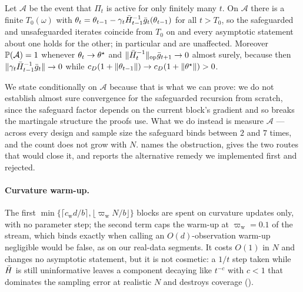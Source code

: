 \begin{proposition}
\label{prop:shift}
Let $\mathcal A$ be the event that $\Pi_t$ is active for only finitely many $t$. On $\mathcal A$
there is a finite $T_0(\omega)$ with
$\theta_t=\theta_{t-1}-\gamma_t\bar{H}_{t-1}^{-1}\bar{g}_t(\theta_{t-1})$ for all $t>T_0$, so the
safeguarded and unsafeguarded iterates coincide from $T_0$ on and every asymptotic statement about
one holds for the other; in particular  and  are
unaffected. Moreover $\mathbb{P}(\mathcal A)=1$ whenever $\theta_t\to\theta^\star$ and
$\lVert \bar{H}_t^{-1} \rVert_{\mathrm{op}}\bar{g}_{t+1}\to0$ almost surely, because then
$\lVert \gamma_t\bar{H}_{t-1}^{-1}\bar{g}_t \rVert\to0$ while $c_D(1+\lVert \theta_{t-1} \rVert)\to c_D(1+\lVert \theta^\star \rVert)>0$.
\end{proposition}

\noindent
We state  conditionally on $\mathcal A$ because that is what we can prove: we do not
establish almost sure convergence for the safeguarded recursion from scratch, since the safeguard factor
depends on the current block's gradient and so breaks the martingale structure the proofs use. What we
do instead is measure $\mathcal A$ --- across every design and sample size the safeguard binds between
$2$ and $7$ times, and the count does not grow with $N$.  names the obstruction, gives
the two routes that would close it, and reports the alternative remedy we implemented first and
rejected.

\paragraph{Curvature warm-up.} The first
$\min\{\lceil c_{\mathrm w}d/b\rceil,\lfloor \varpi_{\mathrm w}N/b\rfloor\}$ blocks are spent on curvature
updates only, with no parameter step; the second term caps the warm-up at $\varpi_{\mathrm w}=0.1$ of the
stream, which binds exactly when calling an $O(d)$-observation warm-up negligible would be false, as on our
real-data segments. It costs $O(1)$ in $N$ and changes no asymptotic statement, but it is not cosmetic: a
$1/t$ step taken while $\bar{H}$ is still uninformative leaves a component decaying like $t^{-c}$ with $c<1$
that dominates the sampling error at realistic $N$ and destroys coverage ().

